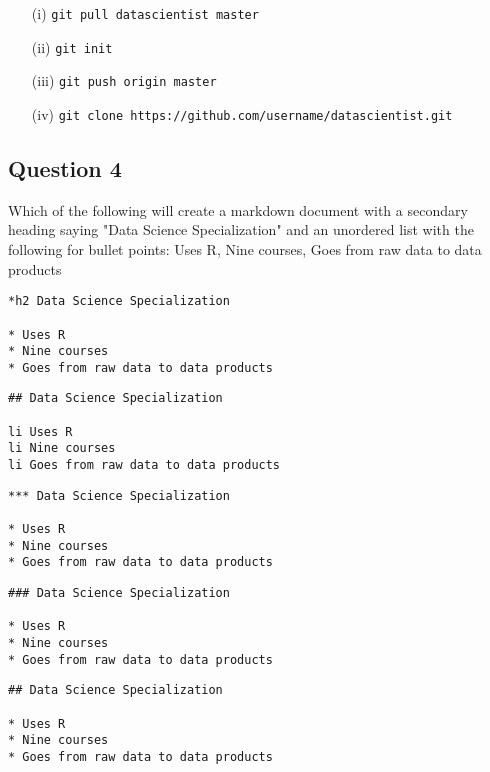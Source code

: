 \documentclass[]{article}
\begin{document}
\begin{itemize}
\item[(i)] \texttt{git pull datascientist master}
\item[(ii)] \texttt{git init}
\item[(iii)] \texttt{git push origin master}
\item[(iv)] \texttt{git clone https://github.com/username/datascientist.git}
\end{itemize}
\newpage
\subsection*{Question 4}
Which of the following will create a markdown document with a secondary heading saying "Data Science Specialization" and an unordered list with the following for bullet points: Uses R, Nine courses, Goes from raw data to data products
\begin{framed}
\begin{verbatim}
*h2 Data Science Specialization 

* Uses R 
* Nine courses 
* Goes from raw data to data products
\end{verbatim}
\end{framed}

\begin{framed}
\begin{verbatim}
## Data Science Specialization 

li Uses R 
li Nine courses 
li Goes from raw data to data products
\end{verbatim}
\end{framed}

\begin{framed}
\begin{verbatim}
*** Data Science Specialization 

* Uses R 
* Nine courses 
* Goes from raw data to data products
\end{verbatim}
\end{framed}

\begin{framed}
\begin{verbatim}
### Data Science Specialization 

* Uses R 
* Nine courses 
* Goes from raw data to data products
\end{verbatim}
\end{framed}
\newpage
\begin{framed}
\begin{verbatim}
## Data Science Specialization 

* Uses R 
* Nine courses 
* Goes from raw data to data products
\end{verbatim}
\end{framed}
\end{document}
